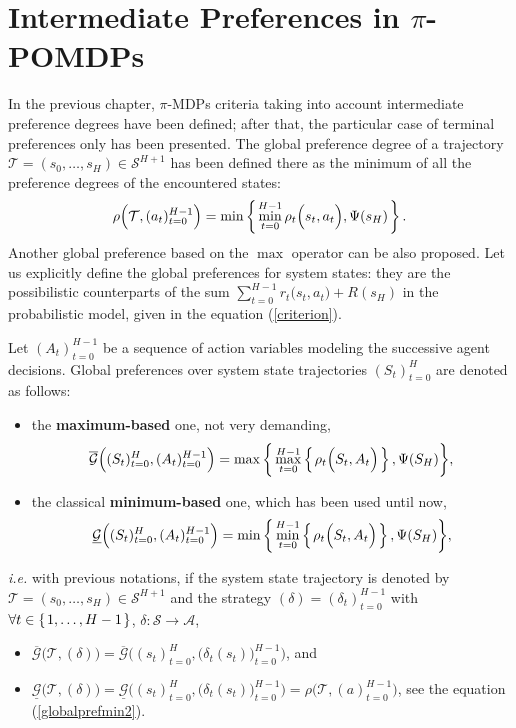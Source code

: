 \section{Intermediate Preferences in $\pi$-POMDPs}
In the previous chapter, 
$\pi$-MDPs criteria 
taking into account 
intermediate preference degrees
have been defined;
after that, the particular case 
of terminal preferences only 
has been presented. 
The global preference degree of a trajectory $\mathcal{T} = (s_0,\ldots,s_{H}) \in \mathcal{S}^{H+1}$ 
has been defined there as the minimum of all the preference degrees of the encountered states:
\begin{equation}
\label{globalprefmin2}
 \rho\Big(\mathcal{T},(a_t)_{t=0}^{H-1}\Big) = \min \left\{ \left.  \min_{t=0}^{H-1} \rho_t\Big(s_t,a_t\Big), \Psi(s_H)  \right. \right\}. 
\end{equation}
Another global preference based on the $\max$ operator can be also proposed. 
Let us explicitly define the global preferences for system states:
they are the possibilistic counterparts 
of the sum $\sum_{t = 0}^{H-1} r_t\Big( s_t, a_t \Big) + R(s_H)$ 
in the probabilistic model, given in the equation (\ref{criterion}).  
\begin{Def}
\label{def_globaldef}
Let $(A_t)_{t=0}^{H-1}$ be a sequence of action variables modeling the successive agent decisions.
Global preferences over system state trajectories $(S_t)_{t=0}^{H}$ are denoted as follows:
\begin{itemize}
\item the \textbf{maximum-based} one, not very demanding,
\begin{equation}
\label{globalprefmax}
\overline{\mathcal{G}} \Big( (S_t)_{t=0}^{H}, (A_t)_{t=0}^{H-1} \Big) = \max \bigg\{ \max_{t=0}^{H-1} \left\{ \left.  \rho_t\Big( S_t, A_t \Big)   \right. \right\}, \Psi(S_H) \bigg\}, 
\end{equation}
\item the classical \textbf{minimum-based} one, which has been used until now,
\begin{equation}
\label{globalprefmin}
\underline{\mathcal{G}} \Big( (S_t)_{t=0}^{H}, (A_t)_{t=0}^{H-1} \Big) = \min \bigg\{ \min_{t=0}^{H-1} \left\{ \left.  \rho_t\Big( S_t, A_t \Big)   \right. \right\}, \Psi(S_H) \bigg\},
\end{equation}
\end{itemize}
 \textit{i.e.} with previous notations, 
if the system state trajectory is denoted by $\mathcal{T} = (s_0,\ldots,s_{H}) \in \mathcal{S}^{H+1}$
and the strategy $(\delta) = (\delta_t)_{t=0}^{H-1}$ with $\forall t \in \left\{ \left. 1,\ldots,H-1 \right. \right\}$, $\delta: \mathcal{S} \rightarrow \mathcal{A}$, 
\begin{itemize}
\item $\overline{\mathcal{G}} \Big( \mathcal{T}, (\delta) \Big) = \overline{\mathcal{G}} \bigg( (s_t)_{t=0}^{H}, \Big(\delta_t(s_t)\Big)_{t=0}^{H-1} \bigg)$, and
\item $\underline{\mathcal{G}} \Big( \mathcal{T}, (\delta) \Big) = \underline{\mathcal{G}} \bigg( (s_t)_{t=0}^{H}, \Big(\delta_t(s_t)\Big)_{t=0}^{H-1} \bigg) = \rho \Big( \mathcal{T},(a)_{t=0}^{H-1} \Big)$, see the equation (\ref{globalprefmin2}).
\end{itemize}
\end{Def}
